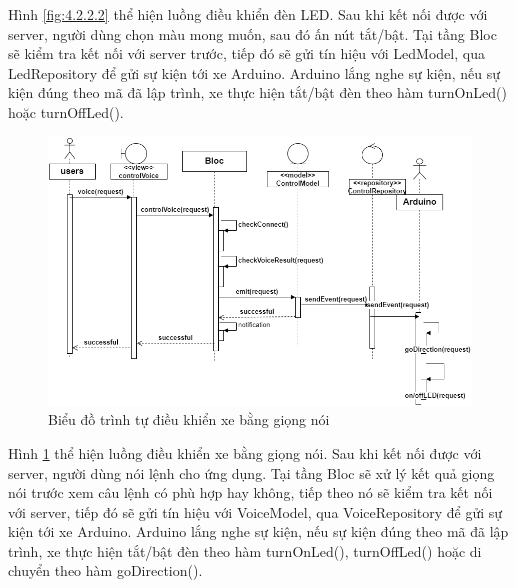 \documentclass[../DoAn.tex]{subfiles}
\begin{document}
Hình \ref{fig:4.2.2.2} thể hiện luồng điều khiển đèn LED. Sau khi kết nối được với server, người dùng chọn màu mong muốn, sau đó ấn nút tắt/bật. Tại tầng Bloc sẽ kiểm tra kết nối với server trước, tiếp đó sẽ gửi tín hiệu với LedModel, qua LedRepository để gửi sự kiện tới xe Arduino. Arduino lắng nghe sự kiện, nếu sự kiện đúng theo mã đã lập trình, xe thực hiện tắt/bật đèn theo hàm turnOnLed() hoặc turnOffLed().

 \begin{figure}[H]
    \centering
    \includegraphics[scale = 0.5]{Hinhve/sequence_dieu_khien_voice.png}
    \caption{Biểu đồ trình tự điều khiển xe bằng giọng nói}
    \label{fig:4.2.2.3}
\end{figure}

Hình \ref{fig:4.2.2.3} thể hiện luồng điều khiển xe bằng giọng nói. Sau khi kết nối được với server, người dùng nói lệnh cho ứng dụng. Tại tầng Bloc sẽ xử lý kết quả giọng nói trước xem câu lệnh có phù hợp hay không, tiếp theo nó sẽ kiểm tra kết nối với server, tiếp đó sẽ gửi tín hiệu với VoiceModel, qua VoiceRepository để gửi sự kiện tới xe Arduino. Arduino lắng nghe sự kiện, nếu sự kiện đúng theo mã đã lập trình, xe thực hiện tắt/bật đèn theo hàm turnOnLed(), turnOffLed() hoặc di chuyển theo hàm goDirection().
\end{document}
